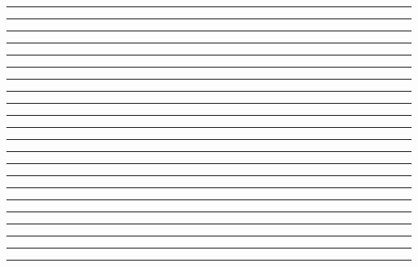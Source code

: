 \documentclass{article}
\begin{document}
\newpage
\noindent{}\rule{1cm}{0.025cm}\framebox{\rule{1cm}{1cm}}

\newpage
\noindent{}\rule{1cm}{0.025cm}

\newpage
\noindent{}\rule{1cm}{0.025cm}

\newpage
\noindent{}\rule{1cm}{0.025cm}

\newpage
\noindent{}\rule{1cm}{0.025cm}

\newpage
\noindent{}\rule{1cm}{0.025cm}

\newpage
\noindent{}\rule{1cm}{0.025cm}

\newpage
\noindent{}\rule{1cm}{0.025cm}

\newpage
\noindent{}\rule{1cm}{0.025cm}

\newpage
\noindent{}\rule{1cm}{0.025cm}

\newpage
\noindent{}\rule{1cm}{0.025cm}

\newpage
\noindent{}\rule{1cm}{0.025cm}

\newpage
\noindent{}\rule{1cm}{0.025cm}

\newpage
\noindent{}\rule{1cm}{0.025cm}

\newpage
\noindent{}\rule{1cm}{0.025cm}

\newpage
\noindent{}\rule{1cm}{0.025cm}

\newpage
\noindent{}\rule{1cm}{0.025cm}

\newpage
\noindent{}\rule{1cm}{0.025cm}

\newpage
\noindent{}\rule{1cm}{0.025cm}

\newpage
\noindent{}\rule{1cm}{0.025cm}

\newpage
\noindent{}\rule{1cm}{0.025cm}

\newpage
\noindent{}\rule{1cm}{0.025cm}
\end{document}
